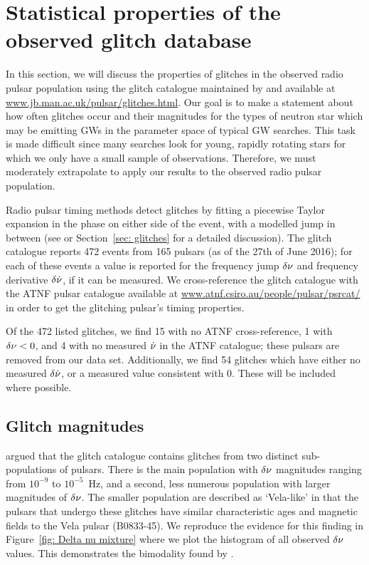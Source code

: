 \documentclass[../full_thesis/full_thesis.tex]{subfiles}
\begin{document}
\section{Statistical properties of the observed glitch database}
\label{sec: statistical properties}
In this section, we will discuss the properties of glitches in the observed
radio pulsar population using the glitch catalogue maintained by \citet{Espinoza2011}
and available at \url{www.jb.man.ac.uk/pulsar/glitches.html}.
Our goal is to make a statement about how often glitches occur and their
magnitudes for the types of neutron star which may be emitting GWs in the
parameter space of typical GW searches.  This task is made difficult since many
searches look for young, rapidly rotating stars for which we only have a small
sample of observations. Therefore, we must moderately extrapolate to apply our
results to the observed radio pulsar population.

Radio pulsar timing methods detect glitches by fitting a piecewise Taylor
expansion in the phase on either side of the event, with a modelled jump in
between (see \citet{Edwards2006} or Section~\ref{sec: glitches} for a detailed
discussion). The glitch catalogue reports 472 events from
165 pulsars (as of the 27th of June 2016); for each of these events a
value is reported for the frequency jump $\delta\nu$ and frequency derivative
$\delta\dot{\nu}$, if it can be measured. We cross-reference the glitch
catalogue with the ATNF \citet{ATNF} pulsar catalogue available at
\url{www.atnf.csiro.au/people/pulsar/psrcat/} in order to get the glitching
pulsar's timing properties.

Of the 472 listed glitches, we find 15 with no ATNF cross-reference, 1 with
$\delta\nu < 0$, and 4 with no measured $\dot{\nu}$ in the ATNF catalogue; these
pulsars are removed from our data set. Additionally, we find 54 glitches which
have either no measured $\delta\dot{\nu}$, or a measured value consistent with 0.
These will be included where possible.

\subsection{Glitch magnitudes}
\label{sec: observed glitch magnitude}

\citet{Espinoza2011} argued that the glitch catalogue contains glitches from
two distinct sub-populations of pulsars. There is the main population with
$\delta\nu$ magnitudes ranging from $10^{-9}$ to $10^{-5}$~Hz, and a second,
less numerous population with larger magnitudes of $\delta\nu$. The smaller
population are described as `Vela-like' in that the pulsars that undergo these
glitches have similar
characteristic ages and magnetic fields to the Vela pulsar (B0833-45).  We reproduce the evidence for this finding in
Figure~\ref{fig: Delta nu mixture} where we plot the histogram of all observed
$\delta\nu$ values. This demonstrates the bimodality found by \citet{Espinoza2011}.
\end{document}
